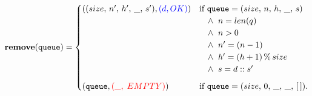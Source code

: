 \documentclass[10pt]{article}
\begin{document}
    \[
        \mathtt{\mathbf{remove}(queue)} = \begin{cases} ((size,\, n', \, h', \, \_, \, s'), {\textcolor{blue}{(d, OK)}}) & \mbox{if } \mathtt{queue} = (size, \,n, \,h, \,\_,\,s)
        \\& \hspace*{10pt}\wedge \;\; n = len(q)
        \\& \hspace*{10pt}\wedge \;\; n > 0
        \\& \hspace*{10pt}\wedge \;\; n' = (n-1)
        \\& \hspace*{10pt}\wedge \;\; h' = (h + 1) \,\%\, size
        \\& \hspace*{10pt}\wedge \;\; s = d::s' \vspace*{6pt}\\

        (\mathtt{queue},{\textcolor{red}{(\_,\; EMPTY)}})  & \mbox{if }\mathtt{queue} = (size, \,0,\,\_,\, \_,\, [\,]). \end{cases} 
    \]
\end{document}
